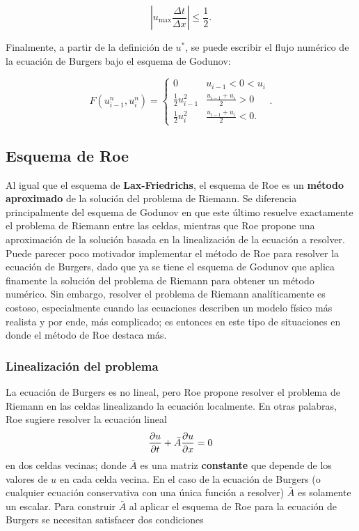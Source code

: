 \documentclass[12pt]{article}
\begin{document}
 	\begin{equation}
 		\left| u_{\text{max}} \frac{\Delta t}{\Delta x}\right| \leq \frac{1}{2} .
 	\end{equation}
 	 
 	 Finalmente, a partir de la definición de $u^{*}$, se puede escribir el flujo numérico de la ecuación de Burgers bajo el esquema de Godunov:
  	
  	\begin{equation}
  		\boxed{F(u_{i-1}^{n}, u_{i}^{n}) =
  		\begin{cases}
  			0 & u_{i-1} < 0 < u_{i}\\
  			\frac{1}{2}u_{i-1}^{2} & \frac{u_{i-1} + u_{i}}{2} > 0 \\
  			\frac{1}{2}u_{i}^{2} & \frac{u_{i-1} + u_{i}}{2} < 0.
  		\end{cases}.}
  		\label{eq:flujo-godunov}
  	\end{equation}
 	 
 	 \subsection{Esquema de Roe}
 	Al igual que el esquema de \textbf{Lax-Friedrichs}, el esquema de Roe es un \textbf{método aproximado} de la solución del problema de Riemann. Se diferencia principalmente del esquema de Godunov en que este último resuelve exactamente el problema de Riemann entre las celdas, mientras que Roe propone una aproximación de la solución basada en la linealización de la ecuación a resolver. Puede parecer poco motivador implementar el método de Roe para resolver la ecuación de Burgers, dado que ya se tiene el esquema de Godunov que aplica finamente la solución del problema de Riemann para obtener un método numérico. Sin embargo, resolver el problema de Riemann analíticamente es costoso, especialmente cuando las ecuaciones describen un modelo físico más realista y por ende, más complicado; es entonces en este tipo de situaciones en donde el método de Roe destaca más.
	
	\subsubsection{Linealización del problema}
	La ecuación de Burgers es no lineal, pero Roe propone resolver el problema de Riemann en las celdas linealizando la ecuación localmente. En otras palabras, Roe sugiere resolver la ecuación lineal
	\begin{equation}
		\pdv{u}{t} + \bar{A} \pdv{u}{x} = 0
		\label{eq:roelineal}
	\end{equation}
	en dos celdas vecinas; donde $\bar{A}$ es una matriz \textbf{constante} que depende de los valores de $u$ en cada celda vecina. En el caso de la ecuación de Burgers (o cualquier ecuación conservativa con una única función a resolver) $\bar{A}$ es solamente un escalar. Para construir $\bar{A}$ al aplicar el esquema de Roe para la ecuación de Burgers se necesitan satisfacer dos condiciones
	
\end{document}
